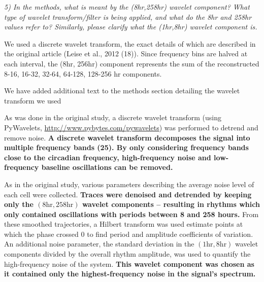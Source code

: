 \documentclass[11pt, letterpaper]{article}
\newenvironment{reviewer}{\itshape\color{gray}}{}
\newenvironment{manuscript}[1]{\begin{center}\begin{tcolorbox}[colback=green!5!white,colframe=green!75!black,width=\textwidth,title={#1},breakable,fonttitle=\bfseries]}{\end{tcolorbox}\end{center}}
\begin{document}
\begin{reviewer}
5) In the methods, what is meant by the (8hr,258hr) wavelet component? What type of wavelet transform/filter is being applied, and what do the 8hr and 258hr values refer to? Similarly, please clarify what the (1hr,8hr) wavelet component is.
\end{reviewer}

We used a discrete wavelet transform, the exact details of which are described in the original article (Leise et al., 2012 (18)).
Since frequency bins are halved at each interval, the (8hr, 256hr) component represents the sum of the reconstructed 8-16, 16-32, 32-64, 64-128, 128-256 hr components.

We have added additional text to the methods section detailing the wavelet transform we used

\begin{manuscript}{Pages 4-5}
  As was done in the original study, a discrete wavelet transform (using PyWavelets, \url{http://www.pybytes.com/pywavelets}) was performed to detrend and remove noise. {\bfseries A discrete wavelet transform decomposes the signal into multiple frequency bands (25). By only considering frequency bands close to the circadian frequency, high-frequency noise and low-frequency baseline oscillations can be removed.}
\end{manuscript}

\begin{manuscript}{Page 5}
As in the original study, various parameters describing the average noise level of each cell were collected.
{\bfseries
Traces were denoised and detrended by keeping only the $(8 \text{hr}, 258 \text{hr})$ wavelet components -- resulting in rhythms which only contained oscillations with periods between 8 and 258 hours.
}
From these smoothed trajectories, a Hilbert transform was used estimate points at which the phase crossed $0$ to find period and amplitude coefficients of variation.
An additional noise parameter, the standard deviation in the $(1 \text{hr}, 8 \text{hr})$ wavelet components divided by the overall rhythm amplitude, was used to quantify the high-frequency noise of the system.
{\bfseries
This wavelet component was chosen as it contained only the highest-frequency noise in the signal's spectrum.
}
\end{manuscript}
\end{document}
